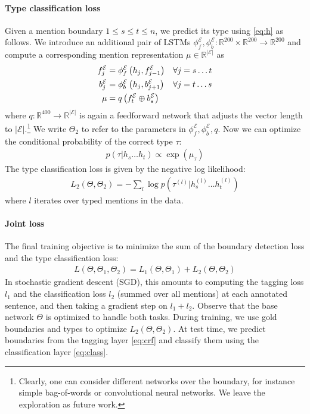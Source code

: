 \documentclass[11pt,letterpaper,UTF8]{article}
\newcommand{\R}{\ensuremath{\mathbb{R}}}
\newcommand{\ra}{\ensuremath{\rightarrow}}
\newcommand{\paren}[1]{\left(#1\right)}
\newcommand{\abs}[1]{\left|#1\right|}
\begin{document}
\paragraph{Type classification loss}
Given a mention boundary $1\leq s \leq t \leq n$, we predict its type using \eqref{eq:h} as follows.
We introduce an additional pair of LSTMs $\phi^{\mathcal{E}}_f, \phi^{\mathcal{E}}_b: \R^{200} \times \R^{200} \ra \R^{200}$ and compute
a corresponding mention representation $\mu \in \R^{\abs{\mathcal{E}}}$ as
\begin{align}
f^{\mathcal{E}}_j &= \phi^{\mathcal{E}}_f\paren{h_j, f^{\mathcal{E}}_{j-1}} &&\forall j = s \ldots t  \notag \\
b^{\mathcal{E}}_j &= \phi^{\mathcal{E}}_b\paren{h_j, b^{\mathcal{E}}_{j+1}} &&\forall j = t \ldots s  \notag \\
\mu &= q\paren{f^{\mathcal{E}}_t \oplus b^{\mathcal{E}}_s} && \label{eq:mention}
\end{align}
where $q: \R^{400} \ra \R^{\abs{\mathcal{E}}}$ is again a feedforward network that adjusts the vector length to $\abs{\mathcal{E}}$.\footnote{Clearly,
one can consider different networks over the boundary, for instance simple bag-of-words or convolutional neural networks. We leave the exploration as future work.}
We write $\Theta_2$ to refer to the parameters in $\phi^{\mathcal{E}}_f, \phi^{\mathcal{E}}_b, q$.
Now we can optimize the conditional probability of the correct type $\tau$:
\begin{align}
p(\tau | h_s \ldots h_t) \propto \exp\paren{\mu_\tau} \label{eq:class}
\end{align}
The type classification loss is given by the negative log likelihood:
\begin{align*}
L_2\paren{\Theta, \Theta_2} = - \sum_l \log p\paren{\tau^{(l)} | h^{(l)}_s \ldots h^{(l)}_t}
\end{align*}
where $l$ iterates over typed mentions in the data.

\paragraph{Joint loss}
The final training objective is to minimize the sum of the boundary detection loss and the type classification loss:
\begin{align}
L(\Theta, \Theta_1, \Theta_2) = L_1\paren{\Theta, \Theta_1} + L_2\paren{\Theta, \Theta_2} \label{eq:joint}
\end{align}
In stochastic gradient descent (SGD), this amounts to computing the tagging loss $l_1$
and the classification loss $l_2$ (summed over all mentions) at each annotated sentence, and then taking a gradient step on $l_1 + l_2$.
Observe that the base network $\Theta$ is optimized to handle both tasks.
During training, we use gold boundaries and types to optimize $L_2\paren{\Theta, \Theta_2}$.
At test time, we predict boundaries from the tagging layer \eqref{eq:crf}
and classify them using the classification layer \eqref{eq:class}.
\end{document}
